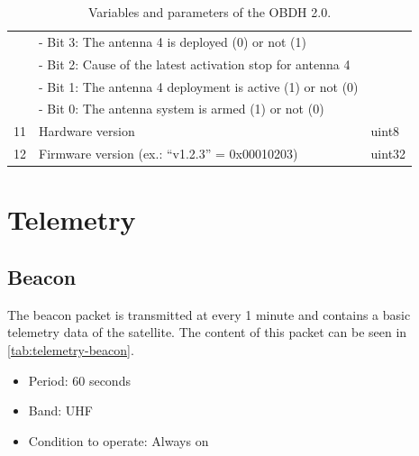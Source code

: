 \begin{table}[!h]
\begin{tabular}{cL{0.82\textwidth}l}
            & - Bit 3: The antenna 4 is deployed (0) or not (1)       &        \\
            & - Bit 2: Cause of the latest activation stop for antenna 4 &     \\
            & - Bit 1: The antenna 4 deployment is active (1) or not (0) &     \\
            & - Bit 0: The antenna system is armed (1) or not (0)     &        \\
        11  & Hardware version                                        & uint8 \\
        12  & Firmware version (ex.: ``v1.2.3'' = 0x00010203)         & uint32 \\
        \bottomrule[1.5pt]
    \end{tabular}
    \caption{Variables and parameters of the OBDH 2.0.}
    \label{tab:vars-and-pars}
\end{table}

\section{Telemetry}


\subsection{Beacon}

The beacon packet is transmitted at every 1 minute and contains a basic telemetry data of the satellite. The content of this packet can be seen in \autoref{tab:telemetry-beacon}.

\begin{itemize}
    \item Period: 60 seconds
    \item Band: UHF
    \item Condition to operate: Always on
\end{itemize}

